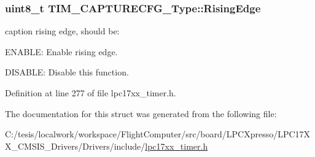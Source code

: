 \hypertarget{struct_t_i_m___c_a_p_t_u_r_e_c_f_g___type_adea8cb5ca2c12442832604d59f07c125}{
\subsubsection[{\-Rising\-Edge}]{\setlength{\rightskip}{0pt plus 5cm}uint8\-\_\-t {\bf \-T\-I\-M\-\_\-\-C\-A\-P\-T\-U\-R\-E\-C\-F\-G\-\_\-\-Type\-::\-Rising\-Edge}}}\label{struct_t_i_m___c_a_p_t_u_r_e_c_f_g___type_adea8cb5ca2c12442832604d59f07c125}
caption rising edge, should be\-:
\begin{DoxyItemize}
\item \-E\-N\-A\-B\-L\-E\-: \-Enable rising edge.
\item \-D\-I\-S\-A\-B\-L\-E\-: \-Disable this function. 
\end{DoxyItemize}

\-Definition at line 277 of file lpc17xx\-\_\-timer.\-h.



\-The documentation for this struct was generated from the following file\-:\begin{DoxyCompactItemize}
\item 
\-C\-:/tesis/localwork/workspace/\-Flight\-Computer/src/board/\-L\-P\-C\-Xpresso/\-L\-P\-C17\-X\-X\-\_\-\-C\-M\-S\-I\-S\-\_\-\-Drivers/\-Drivers/include/\hyperlink{lpc17xx__timer_8h}{lpc17xx\-\_\-timer.\-h}\end{DoxyCompactItemize}
